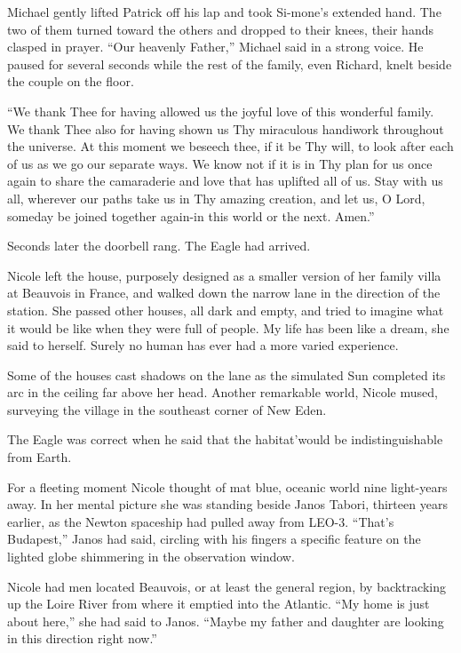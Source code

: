 \documentclass[]{article}
\begin{document}
{Michael gently lifted Patrick off his lap and took Si-mone’s extended hand.  The two of them turned toward the others and dropped to their knees, their hands clasped in prayer.  “Our heavenly Father,” Michael said in a strong voice.  He paused for several seconds while the rest of the family, even Richard, knelt beside the couple on the floor.

“We thank Thee for having allowed us the joyful love of this wonderful family.  We thank Thee also for having shown us Thy miraculous handiwork throughout the universe.  At this moment we beseech thee, if it be Thy will, to look after each of us as we go our separate ways.  We know not if it is in Thy plan for us once again to share the camaraderie and love that has uplifted all of us.  Stay with us all, wherever our paths take us in Thy amazing creation, and let us, O Lord, someday be joined together again-in this world or the next.  Amen.”

Seconds later the doorbell rang.  The Eagle had arrived.

Nicole left the house, purposely designed as a smaller version of her family villa at Beauvois in France, and walked down the narrow lane in the direction of the station.  She passed other houses, all dark and empty, and tried to imagine what it would be like when they were full of people.  My life has been like a dream, she said to herself.  Surely no human has ever had a more varied experience.

Some of the houses cast shadows on the lane as the simulated Sun completed its arc in the ceiling far above her head.  Another remarkable world, Nicole mused, surveying the village in the southeast corner of New Eden.

The Eagle was correct when he said that the habitat’would be indistinguishable from Earth.

For a fleeting moment Nicole thought of mat blue, oceanic world nine light-years away.  In her mental picture she was standing beside Janos Tabori, thirteen years earlier, as the Newton spaceship had pulled away from LEO-3.  “That’s Budapest,” Janos had said, circling with his fingers a specific feature on the lighted globe shimmering in the observation window.

Nicole had men located Beauvois, or at least the general region, by backtracking up the Loire River from where it emptied into the Atlantic.  “My home is just about here,” she had said to Janos.  “Maybe my father and daughter are looking in this direction right now.”

}
\end{document}
